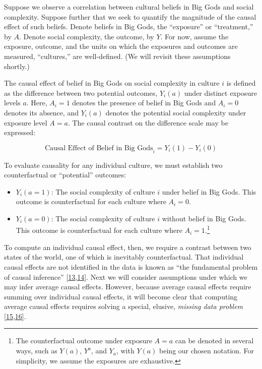 \documentclass[
  singlecolumn]{article}
\providecommand{\tightlist}{%
  \setlength{\itemsep}{0pt}\setlength{\parskip}{0pt}}\usepackage{longtable,booktabs,array}
\begin{document}
Suppose we observe a correlation between cultural beliefs in Big Gods
and social complexity. Suppose further that we seek to quantify the
magnitude of the causal effect of such beliefs. Denote beliefs in Big
Gods, the ``exposure'' or ``treatment,'' by \(A\). Denote social
complexity, the outcome, by \(Y\). For now, assume the exposure,
outcome, and the units on which the exposures and outcomes are measured,
``cultures,'' are well-defined. (We will revisit these assumptions
shortly.)

The causal effect of belief in Big Gods on social complexity in culture
\(i\) is defined as the difference between two potential outcomes,
\(Y_i(a)\) under distinct exposure levels \(a\). Here, \(A_i = 1\)
denotes the presence of belief in Big Gods and \(A_i = 0\) denotes its
absence, and \(Y_i(a)\) denotes the potential social complexity under
exposure level \(A = a\). The causal contrast on the difference scale
may be expressed:

\[
\text{Causal Effect of Belief in Big Gods}_i = Y_i(1) - Y_i(0) 
\]

To evaluate causality for any individual culture, we must establish two
counterfactual or ``potential'' outcomes:

\begin{itemize}
\tightlist
\item
  \(Y_i(a = 1)\): The social complexity of culture \(i\) under belief in
  Big Gods. This outcome is counterfactual for each culture where
  \(A_i = 0\).
\item
  \(Y_i(a = 0)\): The social complexity of culture \(i\) without belief
  in Big Gods. This outcome is counterfactual for each culture where
  \(A_i = 1\).\footnote{The counterfactual outcome under exposure
    \(A = a\) can be denoted in several ways, such as \(Y(a)\),
    \(Y^{a}\), and \(Y_a\), with \(Y(a)\) being our chosen notation. For
    simplicity, we assume the exposures are exhaustive.}
\end{itemize}

To compute an individual causal effect, then, we require a contrast
between two states of the world, one of which is inevitably
counterfactual. That individual causal effects are not identified in the
data is known as ``the fundamental problem of causal inference''
{[}\protect\hyperlink{ref-rubin1976}{13},\protect\hyperlink{ref-holland1986}{14}{]}.
Next we will consider assumptions under which we may infer average
causal effects. However, because average causal effects require summing
over individual causal effects, it will become clear that computing
average causal effects requires solving a special, elusive,
\emph{missing data problem}
{[}\protect\hyperlink{ref-westreich2015}{15},\protect\hyperlink{ref-edwards2015}{16}{]}.
\end{document}
